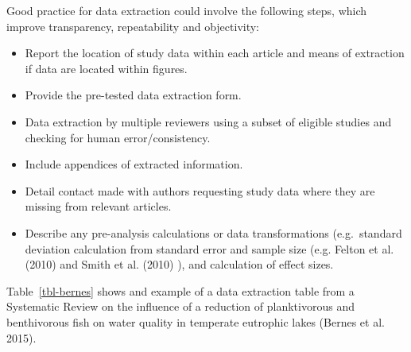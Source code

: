 \documentclass[
  letterpaper,
  DIV=11,
  numbers=noendperiod]{scrreprt}
\begin{document}
Good practice for data extraction could involve the following steps,
which improve transparency, repeatability and objectivity:

\begin{itemize}
\item
  Report the location of study data within each article and means of
  extraction if data are located within figures.
\item
  Provide the pre-tested data extraction form.
\item
  Data extraction by multiple reviewers using a subset of eligible
  studies and checking for human error/consistency.
\item
  Include appendices of extracted information.
\item
  Detail contact made with authors requesting study data where they are
  missing from relevant articles.
\item
  Describe any pre-analysis calculations or data transformations
  (e.g.~standard deviation calculation from standard error and sample
  size (e.g. Felton et al. (2010) and Smith et al. (2010) ), and
  calculation of effect sizes.
\end{itemize}

Table~\ref{tbl-bernes} shows and example of a data extraction table from
a Systematic Review on the influence of a reduction of planktivorous and
benthivorous fish on water quality in temperate eutrophic lakes (Bernes
et al. 2015).
\end{document}
